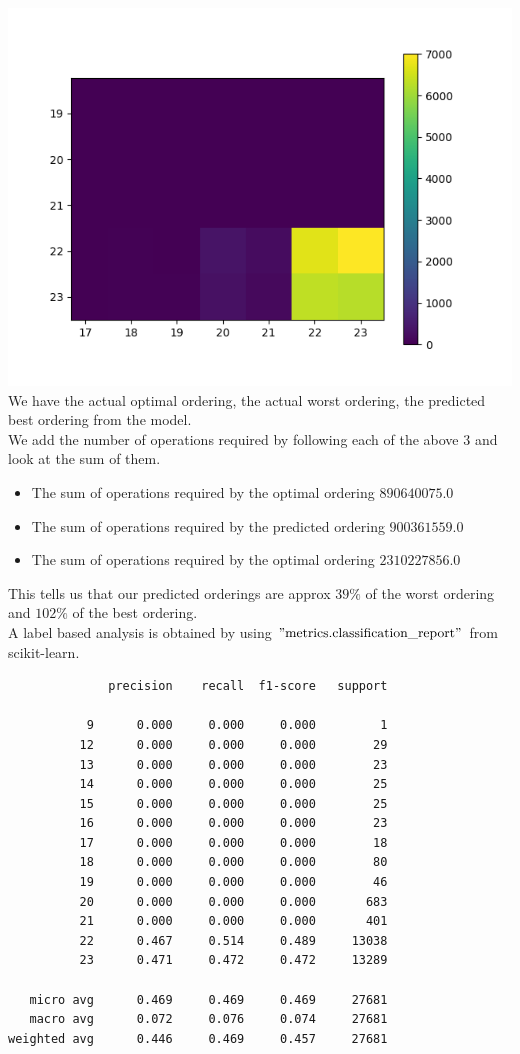 \includegraphics{cm5.png}\\
We have the actual optimal ordering, the actual worst ordering, the predicted best ordering from the model.\\
We add the number of operations required by following each of the above $3$ and look at the sum of them.\\
\begin{itemize}
    \item The sum of operations required by the optimal ordering $890640075.0$
    \item The sum of operations required by the predicted ordering $900361559.0$
    \item The sum of operations required by the optimal ordering $2310227856.0$
\end{itemize}
This tells us that our predicted orderings are approx $39\%$ of the worst ordering and $102\%$ of the best ordering.\\
A label based analysis is obtained by using $"\text{metrics.classification\_report}"$ from \\
 scikit-learn\cite{scikit-learn}.\\
\begin{lstlisting}
              precision    recall  f1-score   support

           9      0.000     0.000     0.000         1
          12      0.000     0.000     0.000        29
          13      0.000     0.000     0.000        23
          14      0.000     0.000     0.000        25
          15      0.000     0.000     0.000        25
          16      0.000     0.000     0.000        23
          17      0.000     0.000     0.000        18
          18      0.000     0.000     0.000        80
          19      0.000     0.000     0.000        46
          20      0.000     0.000     0.000       683
          21      0.000     0.000     0.000       401
          22      0.467     0.514     0.489     13038
          23      0.471     0.472     0.472     13289

   micro avg      0.469     0.469     0.469     27681
   macro avg      0.072     0.076     0.074     27681
weighted avg      0.446     0.469     0.457     27681
\end{lstlisting}

